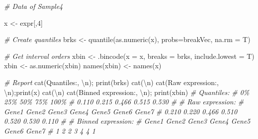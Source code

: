 \documentclass[
  12pt,
]{book}
\newenvironment{Shaded}{\begin{snugshade}}{\end{snugshade}}
\newcommand{\AttributeTok}[1]{\textcolor[rgb]{0.77,0.63,0.00}{#1}}
\newcommand{\CommentTok}[1]{\textcolor[rgb]{0.56,0.35,0.01}{\textit{#1}}}
\newcommand{\DecValTok}[1]{\textcolor[rgb]{0.00,0.00,0.81}{#1}}
\newcommand{\FunctionTok}[1]{\textcolor[rgb]{0.00,0.00,0.00}{#1}}
\newcommand{\NormalTok}[1]{#1}
\newcommand{\OtherTok}[1]{\textcolor[rgb]{0.56,0.35,0.01}{#1}}
\newcommand{\SpecialCharTok}[1]{\textcolor[rgb]{0.00,0.00,0.00}{#1}}
\newcommand{\StringTok}[1]{\textcolor[rgb]{0.31,0.60,0.02}{#1}}
\begin{document}
\begin{Shaded}
\begin{Highlighting}[]

\CommentTok{\# Data of Sample4}

\NormalTok{x }\OtherTok{\textless{}{-}}\NormalTok{ expr[,}\DecValTok{4}\NormalTok{]}

\CommentTok{\# Create quantiles  }
\NormalTok{brks }\OtherTok{\textless{}{-}} \FunctionTok{quantile}\NormalTok{(}\FunctionTok{as.numeric}\NormalTok{(x), }
                 \AttributeTok{probs=}\NormalTok{breakVec, }
                 \AttributeTok{na.rm =}\NormalTok{ T)}

\CommentTok{\# Get interval orders}
\NormalTok{xbin }\OtherTok{\textless{}{-}} \FunctionTok{.bincode}\NormalTok{(}\AttributeTok{x =}\NormalTok{ x, }
                 \AttributeTok{breaks =}\NormalTok{ brks, }
                 \AttributeTok{include.lowest =}\NormalTok{ T)}
\NormalTok{xbin }\OtherTok{\textless{}{-}} \FunctionTok{as.numeric}\NormalTok{(xbin)}
\FunctionTok{names}\NormalTok{(xbin) }\OtherTok{\textless{}{-}} \FunctionTok{names}\NormalTok{(x)}

\CommentTok{\# Report}
\FunctionTok{cat}\NormalTok{(}\StringTok{\textquotesingle{}Quantiles:\textquotesingle{}}\NormalTok{, }\StringTok{\textquotesingle{}}\SpecialCharTok{\textbackslash{}n}\StringTok{\textquotesingle{}}\NormalTok{); }\FunctionTok{print}\NormalTok{(brks)}
\FunctionTok{cat}\NormalTok{(}\StringTok{\textquotesingle{}}\SpecialCharTok{\textbackslash{}n}\StringTok{\textquotesingle{}}\NormalTok{)}
\FunctionTok{cat}\NormalTok{(}\StringTok{\textquotesingle{}Raw expression:\textquotesingle{}}\NormalTok{, }\StringTok{\textquotesingle{}}\SpecialCharTok{\textbackslash{}n}\StringTok{\textquotesingle{}}\NormalTok{);}\FunctionTok{print}\NormalTok{(x)}
\FunctionTok{cat}\NormalTok{(}\StringTok{\textquotesingle{}}\SpecialCharTok{\textbackslash{}n}\StringTok{\textquotesingle{}}\NormalTok{)}
\FunctionTok{cat}\NormalTok{(}\StringTok{\textquotesingle{}Binned expression:\textquotesingle{}}\NormalTok{, }\StringTok{\textquotesingle{}}\SpecialCharTok{\textbackslash{}n}\StringTok{\textquotesingle{}}\NormalTok{); }\FunctionTok{print}\NormalTok{(xbin)}
\CommentTok{\# Quantiles: }
\CommentTok{\#    0\%   25\%   50\%   75\%  100\% }
\CommentTok{\# 0.110 0.215 0.466 0.515 0.530 }
\CommentTok{\# }
\CommentTok{\# Raw expression: }
\CommentTok{\# Gene1 Gene2 Gene3 Gene4 Gene5 Gene6 Gene7 }
\CommentTok{\# 0.210 0.220 0.466 0.510 0.520 0.530 0.110 }
\CommentTok{\# }
\CommentTok{\# Binned expression: }
\CommentTok{\# Gene1 Gene2 Gene3 Gene4 Gene5 Gene6 Gene7 }
\CommentTok{\#     1     2     2     3     4     4     1}
\end{Highlighting}
\end{Shaded}
\end{document}
